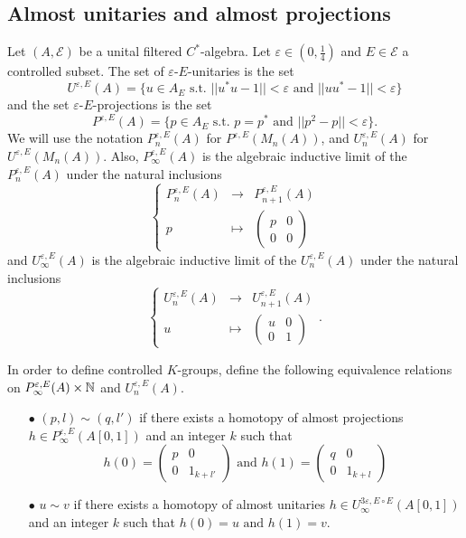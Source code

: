 \subsection{Almost unitaries and almost projections}

\begin{definition}
Let $(A,\mathcal E)$ be a unital filtered $C^*$-algebra. Let $\varepsilon\in(0,\frac{1}{4})$ and $E\in \mathcal E$ a controlled subset. The set of $\varepsilon$-$E$-unitaries is the set 
\[U^{\varepsilon, E}(A)= \{u\in A_E \text{ s.t. } ||u^*u-1||<\varepsilon\text{ and }||uu^*-1||<\varepsilon \}\]
and the set $\varepsilon$-$E$-projections is the set 
\[P^{\varepsilon, E}(A)= \{p\in A_E \text{ s.t. } p=p^*\text{ and }||p^2-p||<\varepsilon \}.\]
We will use the notation $P_n^{\varepsilon, E}(A)$ for $P^{\varepsilon, E}(M_n(A))$, and $U_n^{\varepsilon, E}(A)$ for $U^{\varepsilon, E}(M_n(A))$. Also, $P_\infty^{\varepsilon, E}(A)$ is the algebraic inductive limit of the $P_n^{\varepsilon, E}(A)$ under the natural inclusions
\[\left\{\begin{array}{rcl}
	P^{\varepsilon,E}_n(A) 		& \rightarrow	& P^{\varepsilon,E}_{n+1}(A)\\ 
	p 		& \mapsto 	& \begin{pmatrix}p& 0 \\ 0&0 \end{pmatrix}
\end{array}\right.\]
and $U_\infty^{\varepsilon, E}(A)$ is the algebraic inductive limit of the $U_n^{\varepsilon, E}(A)$ under the natural inclusions
\[\left\{\begin{array}{rcl}
	U^{\varepsilon,E}_n(A) 		& \rightarrow	& U^{\varepsilon,E}_{n+1}(A)\\ 
	u 		& \mapsto 	& \begin{pmatrix}u & 0 \\ 0& 1 \end{pmatrix}
\end{array}\right. .\]
\end{definition}

In order to define controlled $K$-groups, define the following equivalence relations on $P^{\varepsilon, E}_\infty(A)\times \mathbb N$ and $U^{\varepsilon,E}_n(A)$.
\begin{itemize}

\item[$\bullet$] $(p,l) \sim (q,l')$ if there exists a homotopy of almost projections $h\in P^{\varepsilon, E}_\infty(A[0,1])$ and an integer $k$ such that 
\[h(0)=\begin{pmatrix} p & 0 \\ 0 & 1_{k+l'} \end{pmatrix} \text{ and }
h(1)=\begin{pmatrix} q & 0 \\ 0 & 1_{k+l} \end{pmatrix}\]
\item[$\bullet$] $u \sim v$ if there exists a homotopy of almost unitaries $h\in U^{3\varepsilon, E\circ E}_\infty(A[0,1])$ and an integer $k$ such that $h(0)= u \text{ and }h(1)=v$.\\
\end{itemize}


